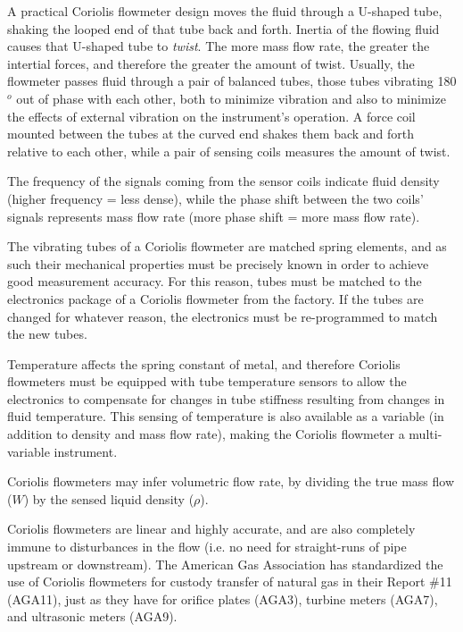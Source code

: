 \vskip 10pt

A practical Coriolis flowmeter design moves the fluid through a U-shaped tube, shaking the looped end of that tube back and forth.  Inertia of the flowing fluid causes that U-shaped tube to {\it twist}.  The more mass flow rate, the greater the intertial forces, and therefore the greater the amount of twist.  Usually, the flowmeter passes fluid through a pair of balanced tubes, those tubes vibrating 180$^{o}$ out of phase with each other, both to minimize vibration and also to minimize the effects of external vibration on the instrument's operation.  A force coil mounted between the tubes at the curved end shakes them back and forth relative to each other, while a pair of sensing coils measures the amount of twist.  

The frequency of the signals coming from the sensor coils indicate fluid density (higher frequency = less dense), while the phase shift between the two coils' signals represents mass flow rate (more phase shift = more mass flow rate).

\vskip 10pt

The vibrating tubes of a Coriolis flowmeter are matched spring elements, and as such their mechanical properties must be precisely known in order to achieve good measurement accuracy.  For this reason, tubes must be matched to the electronics package of a Coriolis flowmeter from the factory.  If the tubes are changed for whatever reason, the electronics must be re-programmed to match the new tubes.

Temperature affects the spring constant of metal, and therefore Coriolis flowmeters must be equipped with tube temperature sensors to allow the electronics to compensate for changes in tube stiffness resulting from changes in fluid temperature.  This sensing of temperature is also available as a variable (in addition to density and mass flow rate), making the Coriolis flowmeter a multi-variable instrument.

\vskip 10pt

Coriolis flowmeters may infer volumetric flow rate, by dividing the true mass flow ($W$) by the sensed liquid density ($\rho$).

\vskip 10pt

Coriolis flowmeters are linear and highly accurate, and are also completely immune to disturbances in the flow (i.e. no need for straight-runs of pipe upstream or downstream).  The American Gas Association has standardized the use of Coriolis flowmeters for custody transfer of natural gas in their Report \#11 (AGA11), just as they have for orifice plates (AGA3), turbine meters (AGA7), and ultrasonic meters (AGA9).

